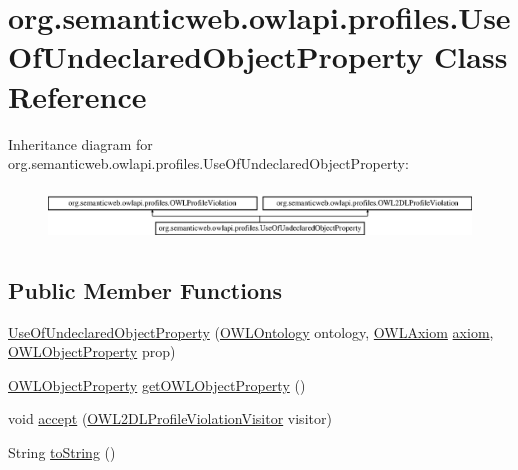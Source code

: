\hypertarget{classorg_1_1semanticweb_1_1owlapi_1_1profiles_1_1_use_of_undeclared_object_property}{\section{org.\-semanticweb.\-owlapi.\-profiles.\-Use\-Of\-Undeclared\-Object\-Property Class Reference}
\label{classorg_1_1semanticweb_1_1owlapi_1_1profiles_1_1_use_of_undeclared_object_property}
}
Inheritance diagram for org.\-semanticweb.\-owlapi.\-profiles.\-Use\-Of\-Undeclared\-Object\-Property\-:\begin{figure}[H]
\begin{center}
\leavevmode
\includegraphics[height=1.432225cm]{classorg_1_1semanticweb_1_1owlapi_1_1profiles_1_1_use_of_undeclared_object_property}
\end{center}
\end{figure}
\subsection*{Public Member Functions}
\begin{DoxyCompactItemize}
\item 
\hyperlink{classorg_1_1semanticweb_1_1owlapi_1_1profiles_1_1_use_of_undeclared_object_property_a516ddfad0cbf5b0b650bae057ad0c916}{Use\-Of\-Undeclared\-Object\-Property} (\hyperlink{interfaceorg_1_1semanticweb_1_1owlapi_1_1model_1_1_o_w_l_ontology}{O\-W\-L\-Ontology} ontology, \hyperlink{interfaceorg_1_1semanticweb_1_1owlapi_1_1model_1_1_o_w_l_axiom}{O\-W\-L\-Axiom} \hyperlink{classorg_1_1semanticweb_1_1owlapi_1_1profiles_1_1_o_w_l_profile_violation_aa7c8e8910ed3966f64a2c003fb516214}{axiom}, \hyperlink{interfaceorg_1_1semanticweb_1_1owlapi_1_1model_1_1_o_w_l_object_property}{O\-W\-L\-Object\-Property} prop)
\item 
\hyperlink{interfaceorg_1_1semanticweb_1_1owlapi_1_1model_1_1_o_w_l_object_property}{O\-W\-L\-Object\-Property} \hyperlink{classorg_1_1semanticweb_1_1owlapi_1_1profiles_1_1_use_of_undeclared_object_property_a766cb2a9ad650479c394ad580a1c0c01}{get\-O\-W\-L\-Object\-Property} ()
\item 
void \hyperlink{classorg_1_1semanticweb_1_1owlapi_1_1profiles_1_1_use_of_undeclared_object_property_a601562f7d2c3fba7036b0e52b92b1783}{accept} (\hyperlink{interfaceorg_1_1semanticweb_1_1owlapi_1_1profiles_1_1_o_w_l2_d_l_profile_violation_visitor}{O\-W\-L2\-D\-L\-Profile\-Violation\-Visitor} visitor)
\item 
String \hyperlink{classorg_1_1semanticweb_1_1owlapi_1_1profiles_1_1_use_of_undeclared_object_property_a574eaaa7421cb7de2a6951dc0197bd4f}{to\-String} ()
\end{DoxyCompactItemize}
